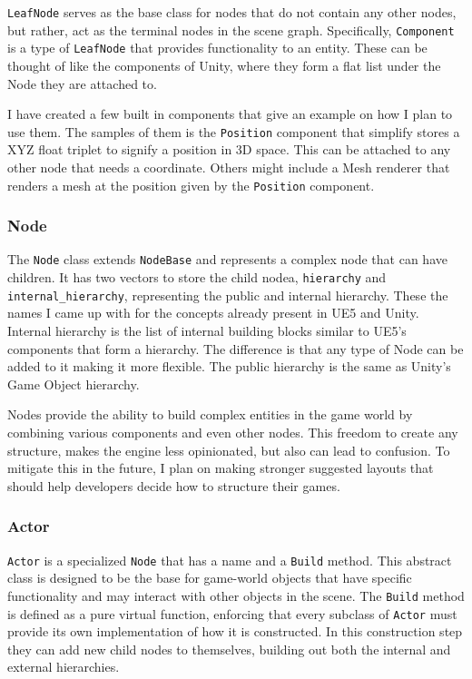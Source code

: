 \verb|LeafNode| serves as the base class for nodes that do not contain any other nodes, but rather, act as the terminal nodes in the scene graph.
Specifically, \verb|Component| is a type of \verb|LeafNode| that provides functionality to an entity.
These can be thought of like the components of Unity, where they form a flat list under the Node they are attached to.

I have created a few built in components that give an example on how I plan to use them. The samples of them is the \verb|Position| component that simplify stores a XYZ float triplet to signify a position in 3D space. This can be attached to any other node that needs a coordinate. Others might include a Mesh renderer that renders a mesh at the position given by the \verb|Position| component.

\subsubsection{Node}

The \verb|Node| class extends \verb|NodeBase| and represents a complex node that can have children.
It has two vectors to store the child nodea, \verb|hierarchy| and \verb|internal_hierarchy|, representing the public and internal hierarchy.
These the names I came up with for the concepts already present in UE5 and Unity.
Internal hierarchy is the list of internal building blocks similar to UE5's components that form a hierarchy. The difference is that any type of Node can be added to it making it more flexible.
The public hierarchy is the same as Unity's Game Object hierarchy.

Nodes provide the ability to build complex entities in the game world by combining various components and even other nodes.
This freedom to create any structure, makes the engine less opinionated, but also can lead to confusion.
To mitigate this in the future, I plan on making stronger suggested layouts that should help developers decide how to structure their games.

\subsubsection{Actor}

\verb|Actor| is a specialized \verb|Node| that has a name and a \verb|Build| method.
This abstract class is designed to be the
base for game-world objects that have specific functionality and may interact with other objects in the scene.
The \verb|Build| method is defined as a pure virtual function, enforcing that every subclass of \verb|Actor| must provide its own implementation of how it is constructed. In this construction step they can add new child nodes to themselves, building out both the internal and external hierarchies.

